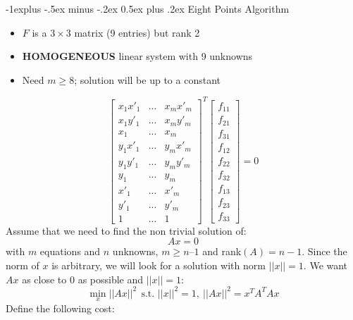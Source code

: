 \documentclass[10pt,landscape]{article}
\makeatletter
\renewcommand{\subsection}{\@startsection{subsection}{2}{0mm}%
                                {-1explus -.5ex minus -.2ex}%
                                {0.5ex plus .2ex}%
                                {\normalfont\normalsize\bfseries}}
\makeatother
\begin{document}
\begin{multicols}{3}
\subsection{Eight Points Algorithm}
\begin{itemize}
    \item $F$ is a $3\times3$ matrix (9 entries) but rank 2
    \item \textbf{HOMOGENEOUS} linear system with 9 unknowns
    \item Need $m \geq 8$; solution will be up to a constant
\end{itemize}
\begin{equation*}
    \left[ \begin{array}{ccc}
x_1x'_1 & ... & x_mx'_m\\
 x_1y'_1 & ... & x_my'_m \\
 x_1 & ... & x_m\\
 y_1x'_1 & ... & y_mx'_m\\
 y_1y'_1 & ... & y_my'_m\\
 y_1 & ... & y_m\\
 x'_1 & ... & x'_m\\
 y'_1 & ... & y'_m\\
 1 & ... & 1
    \end{array} \right ]^T    \left[ \begin{array}{c}
f_11\\
f_21\\
f_31\\
f_12\\
f_22\\
f_32\\
f_13\\
f_23\\
f_33
    \end{array} \right ] = 0
\end{equation*}
Assume that we need to find the non trivial solution of:
\begin{equation*}
    Ax=0
\end{equation*}
with $m$ equations and $n$ unknowns, $m \geq n – 1$ and rank$(A) = n-1$. Since the norm of $x$ is arbitrary, we will look for a solution
with norm $||x|| = 1$. We want $Ax$ as close to $0$ as possible and $||x|| =1$:
\begin{equation*}
    \min_x ||Ax||^2\ \ \text{s.t. } ||x||^2 = 1,\ ||Ax||^2 = x^TA^TAx
\end{equation*}
Define the following cost:
\begin{equation*}

\end{equation*}
\end{multicols}
\end{document}

